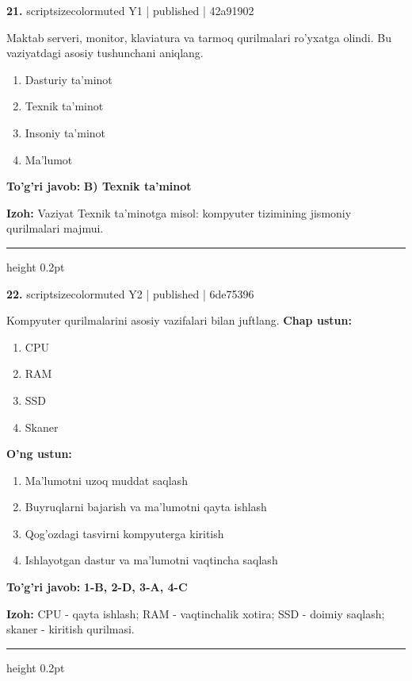 \documentclass[10pt,a4paper]{article}
\begin{document}
{\bfseries\sffamily\color{ink} 21.} {scriptsizecolor{muted} Y1 | published | 42a91902}
\par
Maktab serveri, monitor, klaviatura va tarmoq qurilmalari ro'yxatga olindi. Bu vaziyatdagi asosiy tushunchani aniqlang.
\begin{enumerate}[label=\Alph*),leftmargin=9mm]
\item Dasturiy ta'minot
\item Texnik ta'minot
\item Insoniy ta'minot
\item Ma'lumot
\end{enumerate}
\begin{tcolorbox}[enhanced,breakable,colback=teal!4,colframe=teal!60!black,boxrule=0.45pt,arc=1.2mm,left=2.7mm,right=2.7mm,top=1.8mm,bottom=1.8mm,before skip=2mm,after skip=2mm]
{\bfseries\sffamily\color{teal}To'g'ri javob:} \textbf{B) Texnik ta'minot}
\par\smallskip
{\bfseries Izoh:} Vaziyat Texnik ta'minotga misol: kompyuter tizimining jismoniy qurilmalari majmui.
\end{tcolorbox}
\vspace{2mm}\hrule height 0.2pt\vspace{3mm}

{\bfseries\sffamily\color{ink} 22.} {scriptsizecolor{muted} Y2 | published | 6de75396}
\par
Kompyuter qurilmalarini asosiy vazifalari bilan juftlang.
\textbf{Chap ustun:}
\begin{enumerate}[label=\arabic*),leftmargin=9mm]
\item CPU
\item RAM
\item SSD
\item Skaner
\end{enumerate}
\textbf{O'ng ustun:}
\begin{enumerate}[label=\Alph*),leftmargin=9mm]
\item Ma'lumotni uzoq muddat saqlash
\item Buyruqlarni bajarish va ma'lumotni qayta ishlash
\item Qog'ozdagi tasvirni kompyuterga kiritish
\item Ishlayotgan dastur va ma'lumotni vaqtincha saqlash
\end{enumerate}
\begin{tcolorbox}[enhanced,breakable,colback=teal!4,colframe=teal!60!black,boxrule=0.45pt,arc=1.2mm,left=2.7mm,right=2.7mm,top=1.8mm,bottom=1.8mm,before skip=2mm,after skip=2mm]
{\bfseries\sffamily\color{teal}To'g'ri javob:} \textbf{1-B, 2-D, 3-A, 4-C}
\par\smallskip
{\bfseries Izoh:} CPU - qayta ishlash; RAM - vaqtinchalik xotira; SSD - doimiy saqlash; skaner - kiritish qurilmasi.
\end{tcolorbox}
\vspace{2mm}\hrule height 0.2pt\vspace{3mm}
\end{document}
